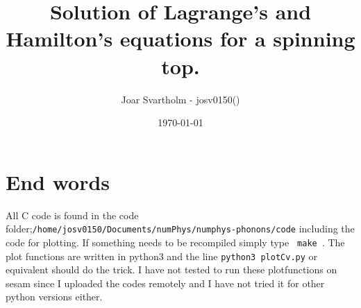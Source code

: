 

  \title{Solution of Lagrange's and Hamilton's equations for a spinning top.}

  \author{
    Joar Svartholm - josv0150()\\
  }
  \date{\today}

\begin{titlepage}
  \maketitle
  \thispagestyle{fancy}
  \headheight 35pt
  \rhead{\small\today}



\end{titlepage}


\newpage
\pagestyle{fancy}
\headheight 30pt
\rhead{\small \myTitle\\\today}
\lhead{\small \myAuthor}
\cfoot{\thepage}

\tableofcontents
\newpage






\section{End words}

All C code is found in the code folder;\newline \verb|/home/josv0150/Documents/numPhys/numphys-phonons/code| including the code for plotting. If something needs to be recompiled simply type \verb| make |. The plot functions are written in python3 and the line \verb|python3 plotCv.py| or equivalent should do the trick. I have not tested to run these plotfunctions on sesam since I uploaded the codes remotely and I have not tried it for other python versions either.




